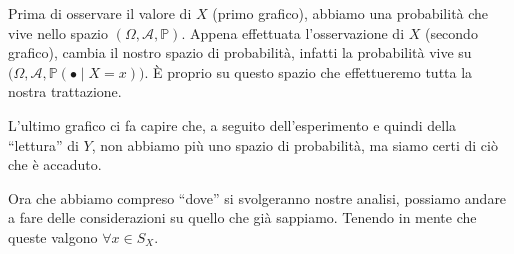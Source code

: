 \begin{figure}[H]
\centering
{}
\end{figure}

Prima di osservare il valore di $X$ (primo grafico), abbiamo una probabilità che vive nello spazio $(\Omega,\mathcal{A}, \mathbb{P})$. Appena effettuata l'osservazione di $X$ (secondo grafico), cambia il nostro spazio di probabilità, infatti la probabilità vive su $\bigl(\Omega,\mathcal{A}, \mathbb{P}(\bullet \mid X=x)\bigr)$. È proprio su questo spazio che effettueremo tutta la nostra trattazione.

\medskip L'ultimo grafico ci fa capire che, a seguito dell'esperimento e quindi della ``lettura'' di $Y$, non abbiamo più uno spazio di probabilità, ma siamo certi di ciò che è accaduto.

\bigskip
\noindent Ora che abbiamo compreso ``dove'' si svolgeranno nostre analisi, possiamo andare a fare delle considerazioni su quello che già sappiamo. Tenendo in mente che queste valgono $\forall x\in S_X$. 

